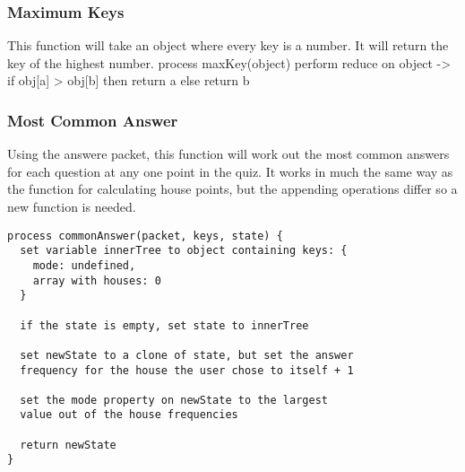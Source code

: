 \subsubsection{Maximum Keys}
This function will take an object where every key is a number. It will return the key of the highest number.
process maxKey(object) {
  perform reduce on object ->
  if obj[a] > obj[b] then return a
  else return b
}

\subsubsection{Most Common Answer}
Using the answere packet, this function will work out the most common answers for each question at any one point in the quiz. It works in much the same way as the function for calculating house points, but the appending operations differ so a new function is needed.
\begin{verbatim}
process commonAnswer(packet, keys, state) {
  set variable innerTree to object containing keys: {
    mode: undefined,
    array with houses: 0
  }

  if the state is empty, set state to innerTree

  set newState to a clone of state, but set the answer
  frequency for the house the user chose to itself + 1

  set the mode property on newState to the largest
  value out of the house frequencies

  return newState
}
\end{verbatim}
